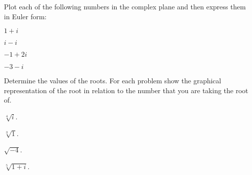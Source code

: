   \begin{problem}

  \item Plot each of the following numbers in the complex plane and
    then express them in Euler form:
    \begin{subproblem}
      \item $1+i$
        \vfill
      \item $i-i$
        \vfill
      \item $-1+2i$
        \vfill
      \item $-3-i$
        \vfill
    \end{subproblem}

    \clearpage

  \item Determine the values of the roots. For each problem show the
    graphical representation of the root in relation to the number
    that you are taking the root of.
    \begin{subproblem}
      \item $\sqrt[4]{i}$. 
        \vfill

      \item $\sqrt[3]{1}$.
        \vfill

      \item $\sqrt{-4}$.
        \vfill

      \item $\sqrt[5]{1+i}$.
        \vfill

    \end{subproblem}

    \clearpage



  \end{problem}
